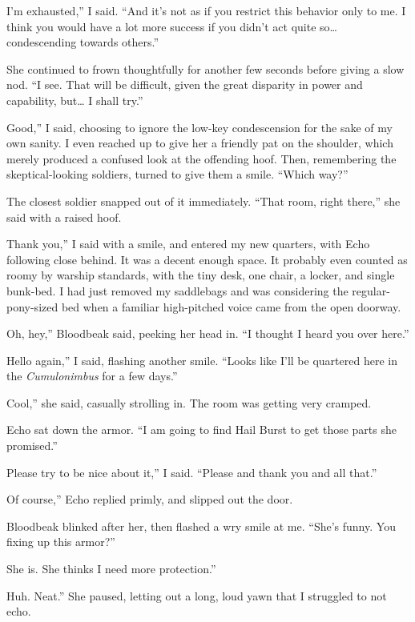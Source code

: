 \leavevmode{}I’m exhausted,” I said. “And it’s not as if you restrict this behavior only to me. I think you would have a lot more success if you didn’t act quite so… condescending towards others.”

She continued to frown thoughtfully for another few seconds before giving a slow nod. “I see. That will be difficult, given the great disparity in power and capability, but… I shall try.”

\leavevmode{}Good,” I said, choosing to ignore the low-key condescension for the sake of my own sanity. I even reached up to give her a friendly pat on the shoulder, which merely produced a confused look at the offending hoof. Then, remembering the skeptical-looking soldiers, turned to give them a smile. “Which way?”

The closest soldier snapped out of it immediately. “That room, right there,” she said with a raised hoof.

\leavevmode{}Thank you,” I said with a smile, and entered my new quarters, with Echo following close behind. It was a decent enough space. It probably even counted as roomy by warship standards, with the tiny desk, one chair, a locker, and single bunk-bed. I had just removed my saddlebags and was considering the regular-pony-sized bed when a familiar high-pitched voice came from the open doorway.

\leavevmode{}Oh, hey,” Bloodbeak said, peeking her head in. “I thought I heard you over here.”

\leavevmode{}Hello again,” I said, flashing another smile. “Looks like I’ll be quartered here in the \textit{Cumulonimbus} for a few days.”

\leavevmode{}Cool,” she said, casually strolling in. The room was getting very cramped.

Echo sat down the armor. “I am going to find Hail Burst to get those parts she promised.”

\leavevmode{}Please try to be nice about it,” I said. “Please and thank you and all that.”

\leavevmode{}Of course,” Echo replied primly, and slipped out the door.

Bloodbeak blinked after her, then flashed a wry smile at me. “She’s funny. You fixing up this armor?”

\leavevmode{}She is. She thinks I need more protection.”

\leavevmode{}Huh. Neat.” She paused, letting out a long, loud yawn that I struggled to not echo.

